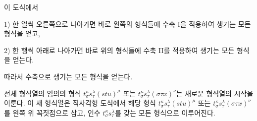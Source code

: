 
이 도식에서

1) 한 열씩 오른쪽으로 나아가면 바로 왼쪽의 형식들에 수축 I을 적용하여 생기는 모든 형식을 얻고,

2) 한 행씩 아래로 나아가면 바로 위의 형식들에 수축 II를 적용하여 생기는 모든 형식을 얻는다.

따라서 수축으로 생기는 모든 형식을 얻는다.

전체 형식열의 임의의 형식 $t_\sigma^\kappa s_\tau^\lambda(stu)^\mu$ 또는 $t_\sigma^\kappa s_\tau^\lambda(\sigma\tau x)^\nu$는 새로운 형식열의 시작을 이룬다. 이 새 형식열은 직사각형 도식에서 해당 형식 $t_\sigma^\kappa s_\tau^\lambda(stu)^\mu$ 또는 $t_\sigma^\kappa s_\tau^\lambda(\sigma\tau x)^\nu$를 왼쪽 위 꼭짓점으로 삼고, 인수 $t_\sigma^\kappa s_\tau^\lambda$를 갖는 모든 형식으로 이루어진다.

